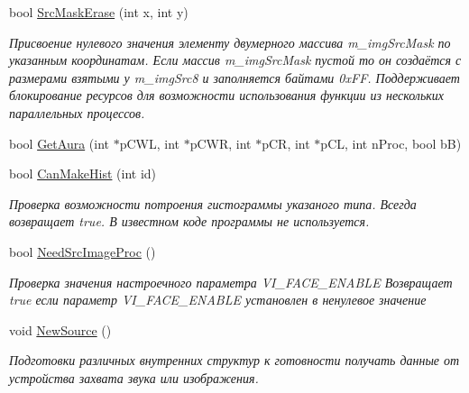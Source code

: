 \begin{DoxyCompactItemize}
bool \hyperlink{class_c_v_i_engine_base_aa12afe22df5c306e03eb855d4fed4fce}{Src\+Mask\+Erase} (int x, int y)
\begin{DoxyCompactList}\small\item\em Присвоение нулевого значения элементу двумерного массива m\+\_\+img\+Src\+Mask по указанным координатам. Если массив m\+\_\+img\+Src\+Mask пустой то он создаётся с размерами взятыми у m\+\_\+img\+Src8 и заполняется байтами 0x\+F\+F. Поддерживает блокирование ресурсов для возможности использования функции из нескольких параллельных процессов. \end{DoxyCompactList}\item 
bool \hyperlink{class_c_v_i_engine_base_aaa7d51c8145d1094997fc485508dd402}{Get\+Aura} (int $\ast$p\+C\+W\+L, int $\ast$p\+C\+W\+R, int $\ast$p\+C\+R, int $\ast$p\+C\+L, int n\+Proc, bool b\+B)
\item 
bool \hyperlink{class_c_v_i_engine_base_a33937f3f067ec0fa9829c7a40b54be50}{Can\+Make\+Hist} (int id)
\begin{DoxyCompactList}\small\item\em Проверка возможности потроения гистограммы указаного типа. Всегда возвращает true. В известном коде программы не используется. \end{DoxyCompactList}\item 
bool \hyperlink{class_c_v_i_engine_base_a1d144bb4fec300b83067404ffdc9ae6f}{Need\+Src\+Image\+Proc} ()
\begin{DoxyCompactList}\small\item\em Проверка значения настроечного параметра V\+I\+\_\+\+F\+A\+C\+E\+\_\+\+E\+N\+A\+B\+L\+E Возвращает true если параметр V\+I\+\_\+\+F\+A\+C\+E\+\_\+\+E\+N\+A\+B\+L\+E установлен в ненулевое значение \end{DoxyCompactList}\item 
void \hyperlink{class_c_v_i_engine_base_afcadee160287c12571501a09c222bea3}{New\+Source} ()
\begin{DoxyCompactList}\small\item\em Подготовки различных внутренних структур к готовности получать данные от устройства захвата звука или изображения. \end{DoxyCompactList}\end{DoxyCompactItemize}
